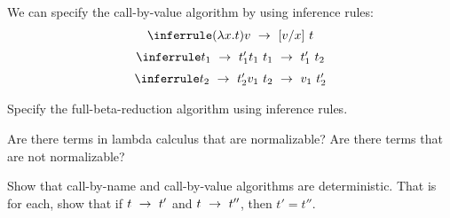 \begin{gram}

We can specify the call-by-value algorithm by using inference rules:
\[
\begin{array}{c}
\infer {(\l x.t) v \red [v/x]~t} {\strut}
\\[2mm]
\infer {t_1~t_1 \red t_1'~t_2} {t_1 \red t_1'}
\\[2mm]
\infer {v_1~t_2 \red v_1~t_2'} {t_2 \red t_2'}
\end{array}
\]
\end{gram}

\begin{exercise}
Specify the full-beta-reduction algorithm using inference rules.
\end{exercise}



\begin{exercise}
Are there terms in lambda calculus that are normalizable?  Are there terms that are not normalizable?
\end{exercise}

\begin{exercise}
Show that call-by-name and call-by-value algorithms are deterministic. 
%
That is for each, show that if $t ~\rightarrow~ t'$ and $t ~\rightarrow~ t''$, then $t' =
t''$.
\end{exercise}













